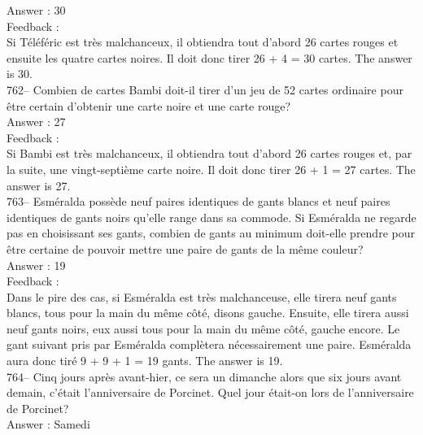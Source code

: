 ﻿\documentclass[letterpaper, 12pt]{article}
\begin{document}
Answer : 30\\

Feedback : \\
Si T\'el\'ef\'eric est tr\`es malchanceux, il obtiendra tout d'abord 26
cartes rouges et ensuite les quatre cartes noires.  Il doit donc tirer 26 +
4 = 30 cartes.  The answer is 30.\\

762-- Combien de cartes Bambi doit-il tirer d'un jeu de 52 cartes ordinaire
pour \^etre certain d'obtenir une carte noire et une carte rouge?\\

Answer : 27\\

Feedback : \\
Si Bambi est tr\`es malchanceux, il obtiendra tout d'abord 26 cartes rouges
et, par la suite, une vingt-septi\`eme carte noire.  Il doit donc tirer 26 +
1 = 27 cartes. The answer is 27.\\

763-- Esm\'eralda poss\`ede neuf paires identiques de gants blancs et neuf
paires identiques de gants noirs qu'elle range dans sa commode.  Si
Esm\'eralda ne regarde pas en choisissant ses gants, combien de gants au
minimum doit-elle prendre pour \^etre certaine de pouvoir mettre une paire
de gants de la m\^eme couleur?\\

Answer : 19\\

Feedback : \\
Dans le pire des cas, si Esm\'eralda est tr\`es malchanceuse, elle tirera
neuf gants blancs, tous pour la main du m\^eme c\^ot\'e, disons gauche.
Ensuite, elle tirera aussi neuf gants noirs, eux aussi tous pour la main du
m\^eme c\^ot\'e, gauche encore. Le gant suivant pris par Esm\'eralda
compl\`etera n\'ecessairement une paire. Esm\'eralda aura donc tir\'e 9 + 9
+ 1 = 19 gants.  The answer is 19.\\

764-- Cinq jours apr\`es avant-hier, ce sera un dimanche alors que six jours
avant demain, c'\'etait l'anniversaire de Porcinet.  Quel jour \'etait-on
lors de l'anniversaire de Porcinet?\\

Answer : Samedi\\
\end{document}
